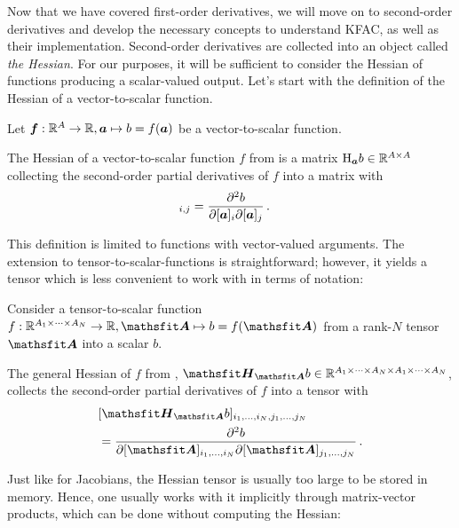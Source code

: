Now that we have covered first-order derivatives, we will move on to second-order derivatives and develop the necessary concepts to understand KFAC, as well as their implementation.
Second-order derivatives are collected into an object called \emph{the Hessian}.
For our purposes, it will be sufficient to consider the Hessian of functions producing a scalar-valued output.
Let's start with the definition of the Hessian of a vector-to-scalar function.

\begin{setup}\label{setup:vector_to_scalar_function}
  Let ${\bm{f}}: {\mathbb{R}}^A \to {\mathbb{R}}, {\bm{a}} \mapsto b = f({\bm{a}})$ be a vector-to-scalar function.
\end{setup}

\begin{definition}\label{def:vector_hessian}
  The Hessian of a vector-to-scalar function $f$ from  is a matrix $\mathrm{H}_{{\bm{a}}}b \in {\mathbb{R}}^{A \times A}$ collecting the second-order partial derivatives of $f$ into a matrix with
  \begin{align*}
    [\hess_{\va}b]_{i,j}
     & =
    \frac{\partial^2 b}{\partial [\va]_i \partial [\va]_j}\,.
  \end{align*}
\end{definition}
This definition is limited to functions with vector-valued arguments. The extension to tensor-to-scalar-functions is straightforward; however, it yields a tensor which is less convenient to work with in terms of notation:

\begin{setup}\label{setup:hessians}
  Consider a tensor-to-scalar function $f: \sR^{A_1 \times \dots \times A_N} \to \sR, \tA \mapsto b = f(\tA)$ from a rank-$N$ tensor $\tA$ into a scalar $b$.
\end{setup}

\begin{definition}\label{def:general_hessian}
  The general Hessian of $f$ from , $\tH_{\tA}b \in \sR^{A_1 \times \dots \times A_N \times A_1 \times \dots \times A_N}$, collects the second-order partial derivatives of $f$ into a tensor with
  \begin{align*}
     & [\tH_{\tA}b]_{i_1, \dots, i_N, j_1, \dots, j_N}
    \\
     & =
    \frac{\partial^2 b}{\partial [\tA]_{i_1, \dots, i_N} \partial [\tA]_{j_1, \dots, j_N}}\,.
  \end{align*}
\end{definition}
Just like for Jacobians, the Hessian tensor is usually too large to be stored in memory.
Hence, one usually works with it implicitly through matrix-vector products, which can be done without computing the Hessian:

